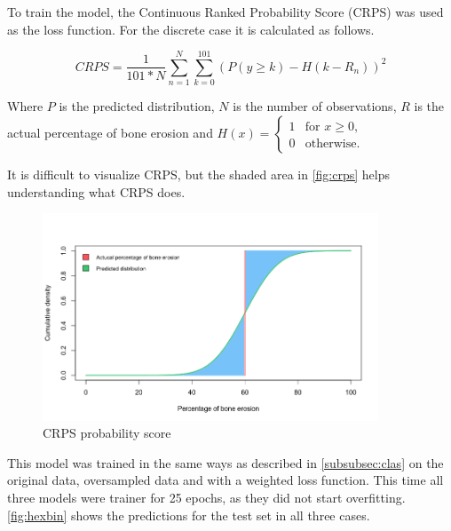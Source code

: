 \documentclass[12pt]{article}
\begin{document}
To train the model, the Continuous Ranked Probability Score (CRPS) was used as the loss function. For the discrete case it is calculated as follows. \cite{crps}

$$CRPS = \frac{1}{101 * N} \sum\limits_{n=1}^{N} \sum\limits_{k=0}^{101} (P(y \geq k) - H(k - R_n))^2$$

Where $P$ is the predicted distribution, $N$ is the number of observations, $R$ is the actual percentage of bone erosion and $H(x) = \begin{cases}
1 & \text{for $x \geq 0$,}\\
0 & \text{otherwise.}
\end{cases}$ \cite{crps}

It is difficult to visualize CRPS, but the shaded area in \autoref{fig:crps} helps understanding what CRPS does. \cite{crps}

\begin{figure}[ht]
\includegraphics[width=10cm]{crps}	
\caption{CRPS probability score}
\label{fig:crps}
\end{figure}

This model was trained in the same ways as described in \ref{subsubsec:clas} on the original data, oversampled data and with a weighted loss function. This time all three models were trainer for 25 epochs, as they did not start overfitting. \autoref{fig:hexbin} shows the predictions for the test set in all three cases.
\end{document}
